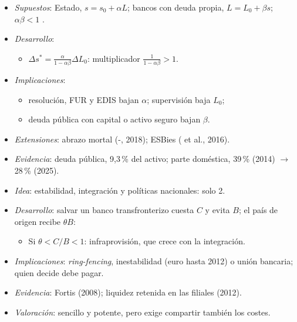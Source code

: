 \documentclass{article}
\begin{document}
\begin{columnas}
\begin{itemize}
\item \emph{Supuestos}: Estado, $s=s_0+\alpha L$; bancos con deuda propia, $L=L_0+\beta s$; $\alpha\beta<1$ .
\item \emph{Desarrollo}:
  \begin{itemize}
  \item $\Delta s^*=\frac{\alpha}{1-\alpha\beta}\Delta L_0$: multiplicador $\frac{1}{1-\alpha\beta}>1$.
  \end{itemize}
\item \emph{Implicaciones}:
  \begin{itemize}
  \item resolución, FUR y EDIS bajan $\alpha$; supervisión baja $L_0$;
  \item deuda pública con capital o activo seguro bajan $\beta$.
  \end{itemize}
\item \emph{Extensiones}: abrazo mortal (-, 2018); ESBies ( et al., 2016).
\item \emph{Evidencia}: deuda pública, 9,3\,\% del activo; parte doméstica, 39\,\% (2014) $\to$ 28\,\% (2025).
\end{itemize}
\begin{itemize}
\item \emph{Idea}: estabilidad, integración y políticas nacionales: solo 2.
\item \emph{Desarrollo}: salvar un banco transfronterizo cuesta $C$ y evita $B$; el país de origen recibe $\theta B$:
  \begin{itemize}
  \item Si $\theta<C/B<1$: infraprovisión, que crece con la integración.
  \end{itemize}
\item \emph{Implicaciones}: \emph{ring-fencing}, inestabilidad (euro hasta 2012) o unión bancaria; quien decide debe pagar.
\item \emph{Evidencia}: Fortis (2008); liquidez retenida en las filiales (2012).
\item \emph{Valoración}: sencillo y potente, pero exige compartir también los costes.
\end{itemize}


\end{columnas}
\end{document}
